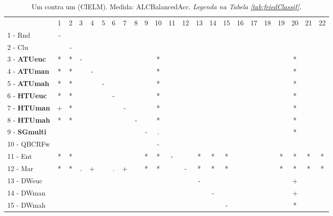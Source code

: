 \begin{table}[h]
\caption{Um contra um (CIELM). Medida: ALCBalancedAcc. \textit{Legenda na Tabela \ref{tab:friedClassif}.}}
\begin{center}\begin{tabular}{lcc|cc|cc|cc|cc|cc|cc|cc|cc|cc|cc}
 			& 1 & 2 & 3 & 4 & 5 & 6 & 7 & 8 & 9 & 10 & 11 & 12 & 13 & 14 & 15 & 16 & 17 & 18 & 19 & 20 & 21 & 22\\
1 - Rnd  	& - &   &   &   &   &   &   &   &   &   &   &   &   &   &   &   &   &   &   &   &   &   \\
2 - Clu  	&   & - &   &   &   &   &   &   &   &   &   &   &   &   &   &   &   &   &   &   &   &   \\ \hline
3 - \textbf{ATUeuc}	& * & * & - &   &   &   &   &   &   & * &   &   &   &   &   &   &   &   &   & * &   &   \\
4 - \textbf{ATUman}	& * & * &   & - &   &   &   &   &   & * &   &   &   &   &   &   &   &   &   & * &   &   \\ \hline
5 - \textbf{ATUmah}	& * & * &   &   & - &   &   &   &   & * &   &   &   &   &   &   &   &   &   & * &   &   \\
6 - \textbf{HTUeuc}	& * & * &   &   &   & - &   &   &   & * &   &   &   &   &   &   &   &   &   & * &   &   \\ \hline
7 - \textbf{HTUman}	& + & * &   &   &   &   & - &   &   & * &   &   &   &   &   &   &   &   &   & * &   &   \\
8 - \textbf{HTUmah}	& * & * &   &   &   &   &   & - &   & * &   &   &   &   &   &   &   &   &   & * &   &   \\ \hline
9 - \textbf{SGmulti}	&   &   &   &   &   &   &   &   & - & . &   &   &   &   &   &   &   &   &   & * &   &   \\
10 - QBCRFw	&   &   &   &   &   &   &   &   &   & - &   &   &   &   &   &   &   &   &   &   &   &   \\ \hline
11 - Ent  	& * & * &   &   &   &   &   &   & * & * & - &   & * & * & * &   &   &   & * & * & * & * \\
12 - Mar  	& * & * & . & + &   & . & + &   & * & * &   & - & * & * & * &   &   &   & * & * & * & * \\ \hline
13 - DWeuc	&   &   &   &   &   &   &   &   &   &   &   &   & - &   &   &   &   &   &   & + &   &   \\
14 - DWman	&   &   &   &   &   &   &   &   &   &   &   &   &   & - &   &   &   &   &   & + &   &   \\ \hline
15 - DWmah	&   &   &   &   &   &   &   &   &   &   &   &   &   &   & - &   &   &   &   & * &   &   \\

\end{tabular}
\end{center}
\end{table}
